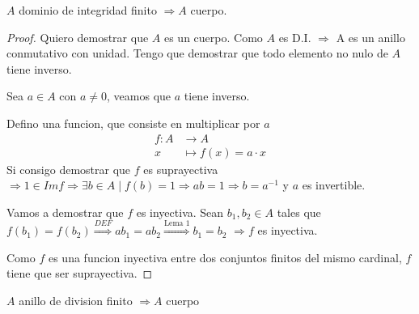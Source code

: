 \begin{theorem}
	\(A \) dominio de integridad finito \(\Rightarrow A \) cuerpo.
\end{theorem}
\begin{proof}
	Quiero demostrar que \(A \) es un cuerpo. Como \(A \) es D.I. \(\Rightarrow \) A es un anillo conmutativo con unidad. Tengo que demostrar que todo elemento no nulo de \(A \) tiene inverso.
	
	Sea \(a \in A \) con \(a \neq 0 \), veamos que \(a \) tiene inverso.
	
	Defino una funcion, que consiste en multiplicar por \(a \)
	\[
		\begin{aligned}
			f \colon A & \longrightarrow A               \\
			x          & \longmapsto f (x ) = a \cdot x
		\end{aligned}
	\]
	Si consigo demostrar que \(f \) es suprayectiva \(\Rightarrow 1 \in Imf \Rightarrow \exists b \in A \mid f(b) = 1 \Rightarrow ab = 1 \Rightarrow b = a^{-1}\) y \(a \) es invertible.
	
	Vamos a demostrar que \(f \) es inyectiva. Sean \(b_1,b_2 \in A \) tales que \(f(b_1) = f(b_2 ) \overset{DEF}{\Rightarrow} ab_1 = ab_2 \overset{\text{Lema 1}}{\Rightarrow} b_1 = b_2\) \(\Rightarrow f \) es inyectiva.
	
	Como \(f \) es una funcion inyectiva entre dos conjuntos finitos del mismo cardinal, \(f \) tiene que ser suprayectiva.
\end{proof}

\begin{theorem}[Wedderburn]
	\(A \) anillo de division finito \(\Rightarrow A \) cuerpo
\end{theorem}

